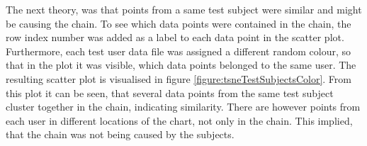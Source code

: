 




The next theory, was that points from a same test subject were similar and might be causing the chain. To see which data points were contained in the chain, the row index number was added as a label to each data point in the scatter plot. Furthermore, each test user data file was assigned a different random colour, so that in the plot it was visible, which data points belonged to the same user. The resulting scatter plot is visualised in figure \ref{figure:tsneTestSubjectsColor}. From this plot it can be seen, that several data points from the same test subject cluster together in the chain, indicating similarity. There are however points from each user in different locations of the chart, not only in the chain. This implied, that the chain was not being caused by the subjects. 

